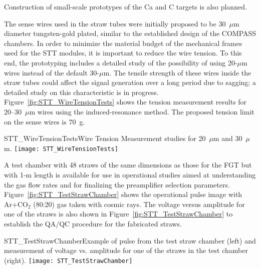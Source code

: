 Construction of small-scale prototypes of the Ca and C targets is also planned.


The sense wires used in the straw tubes were initially proposed to be
30~$\mu$m diameter tungsten-gold plated, similar to the established
design of the COMPASS chambers. In order to minimize the material
budget of the mechanical frames used for the STT modules, it is
important to reduce the wire tension. To this end, the prototyping
includes a detailed study of the possibility of using 20-$\mu$m wires
instead of the default 30-$\mu$m. The tensile strength of these wires
inside the straw tubes could affect the signal generation over a long
period due to sagging; a detailed study on this characteristic is in progress. 
Figure~\ref{fig:STT_WireTensionTests} shows the
tension measurement results for 20--30~$\mu$m wires using the induced-resonance method.  
The proposed tension limit on the sense wires is
70~g.
\begin{cdrfigure}
{STT_WireTensionTests}{Wire Tension Measurement studies for 20~$\mu$m and 30~$\mu$m.}
\texttt{[image: STT\_WireTensionTests]}
\end{cdrfigure}


A test chamber with 48 straws of the same dimensions as those for the FGT but
with 1-m length is available for use in operational studies aimed at understanding
the gas flow rates and for finalizing the preamplifier selection
parameters.  Figure~\ref{fig:STT_TestStrawChamber} shows the
operational pulse image with Ar+CO$_2$ (80:20) gas taken with cosmic
rays. The voltage versus amplitude for one of the straws is also shown
in Figure~\ref{fig:STT_TestStrawChamber} to establish the QA/QC
procedure for the fabricated straws.
\begin{cdrfigure}
{STT_TestStrawChamber}{Example of pulse from the test straw chamber (left) and
measurement of voltage vs. amplitude for one of the straws in the test chamber (right).}
\texttt{[image: STT\_TestStrawChamber]}
\end{cdrfigure}


